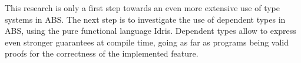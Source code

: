This research is only a first step towards an even more extensive use of type systems in ABS. The next step is to investigate the use of dependent types in ABS, using the pure functional language Idris. Dependent types allow to express even stronger guarantees at compile time, going as far as programs being valid proofs for the correctness of the implemented feature.